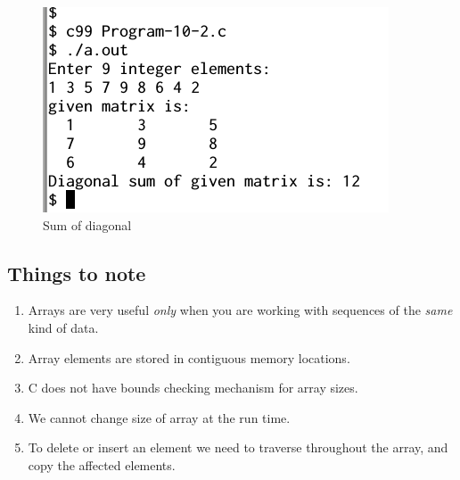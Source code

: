 \documentclass[11pt,a4paper]{article}
\begin{document}
\begin{figure}[ht]
\label{output-10-2}
\begin{center}
\includegraphics[scale=0.6]{Output-10-2.png}
\caption{Sum of diagonal}
\end{center}
\end{figure}

\subsection*{Things to note} 
\begin{enumerate}
\item Arrays are very useful \emph{only} when you are working with sequences of the \emph{same} kind of data. 
\item Array elements are stored in contiguous memory locations.
\item C does not have bounds checking mechanism for array sizes.
\item We cannot change size of array at the run time.
\item To delete or insert an element we need to traverse throughout the array, and copy the affected elements.
\end{enumerate}
\end{document}
